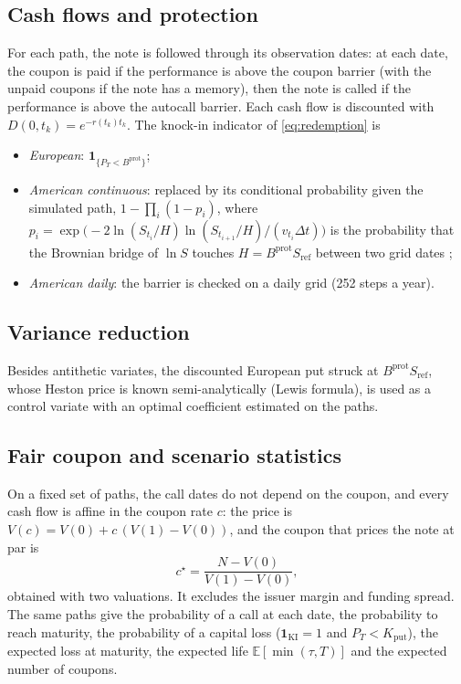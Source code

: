 \documentclass[11pt,a4paper]{article}
\newcommand{\E}{\mathbb{E}}
\newcommand{\ind}{\mathbf{1}}
\newcommand{\Sref}{S_{\mathrm{ref}}}
\begin{document}
\subsection{Cash flows and protection}
For each path, the note is followed through its observation dates: at each date, the coupon is paid if the
performance is above the coupon barrier (with the unpaid coupons if the note has a memory), then the note is called
if the performance is above the autocall barrier. Each cash flow is discounted with $D(0,t_k) = e^{-r(t_k) t_k}$.
The knock-in indicator of \eqref{eq:redemption} is
\begin{itemize}
\item \emph{European}: $\ind_{\{P_T < B^{\mathrm{prot}}\}}$;
\item \emph{American continuous}: replaced by its conditional probability given the simulated path,
$1 - \prod_i (1 - p_i)$, where
$p_i = \exp\!\big(-2 \ln(S_{t_i}/H) \ln(S_{t_{i+1}}/H) / (v_{t_i}\Delta t)\big)$ is the probability that the
Brownian bridge of $\ln S$ touches $H = B^{\mathrm{prot}}\Sref$ between two grid dates \cite{beaglehole1997};
\item \emph{American daily}: the barrier is checked on a daily grid (252 steps a year).
\end{itemize}

\subsection{Variance reduction}
Besides antithetic variates, the discounted European put struck at $B^{\mathrm{prot}}\Sref$, whose Heston price
is known semi-analytically (Lewis formula), is used as a control variate with an optimal coefficient estimated on
the paths.

\subsection{Fair coupon and scenario statistics}
On a fixed set of paths, the call dates do not depend on the coupon, and every cash flow is affine in the coupon
rate $c$: the price is $V(c) = V(0) + c\,(V(1) - V(0))$, and the coupon that prices the note at par is
\begin{equation}
c^\star = \frac{N - V(0)}{V(1) - V(0)},
\end{equation}
obtained with two valuations. It excludes the issuer margin and funding spread. The same paths give the
probability of a call at each date, the probability to reach maturity, the probability of a capital loss
($\ind_{\mathrm{KI}} = 1$ and $P_T < K_{\mathrm{put}}$), the expected loss at maturity, the expected life
$\E[\min(\tau, T)]$ and the expected number of coupons.
\end{document}
